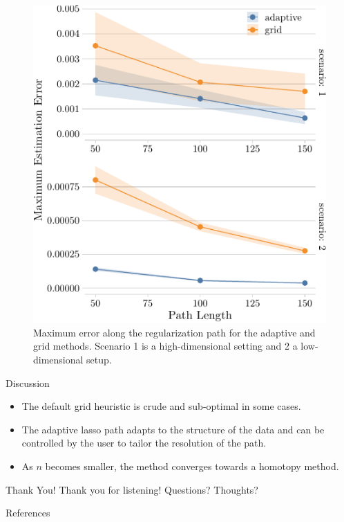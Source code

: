 \documentclass[10pt,ignorenonframetext]{beamer}
\begin{document}
\begin{frame}{}
  \begin{figure}
    \includegraphics[width=0.6\linewidth]{figures/max-error.pdf}
    \caption{Maximum error along the regularization path for the adaptive and
      grid methods. Scenario 1 is a high-dimensional setting and 2 a
      low-dimensional setup.}
  \end{figure}

\end{frame}

\begin{frame}{Discussion}
  \begin{itemize}
    \item The default grid heuristic is crude and sub-optimal in some cases.
    \item The adaptive lasso path adapts to the structure of the data and can be
      controlled by the user to tailor the resolution of the path.
    \item As \(n\) becomes smaller, the method converges towards a homotopy
      method.
  \end{itemize}
\end{frame}

\begin{frame}{Thank You!}
  Thank you for listening! Questions? Thoughts?
\end{frame}


\begin{frame}[allowframebreaks]{References}
  \bibliographytrue
  \printbibliography[heading=none]
\end{frame}
\end{document}
